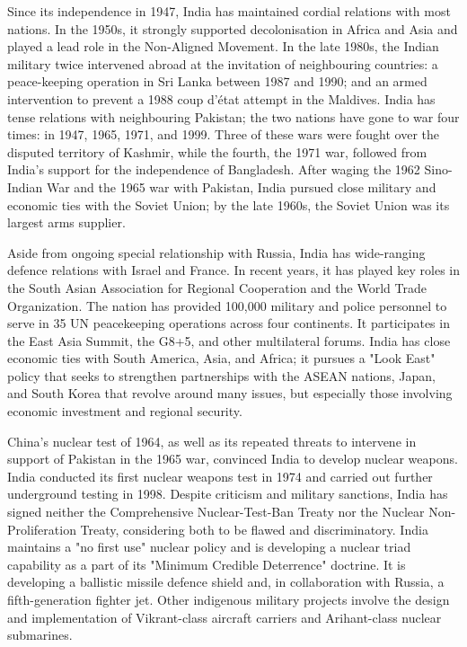 Since its independence in 1947, India has maintained cordial relations
with most nations. In the 1950s, it strongly supported decolonisation in
Africa and Asia and played a lead role in the Non-Aligned Movement. In
the late 1980s, the Indian military twice intervened abroad at the
invitation of neighbouring countries: a peace-keeping operation in Sri
Lanka between 1987 and 1990; and an armed intervention to prevent a 1988
coup d'état attempt in the Maldives. India has tense relations with
neighbouring Pakistan; the two nations have gone to war four times: in
1947, 1965, 1971, and 1999. Three of these wars were fought over the
disputed territory of Kashmir, while the fourth, the 1971 war, followed
from India's support for the independence of Bangladesh. After waging
the 1962 Sino-Indian War and the 1965 war with Pakistan, India pursued
close military and economic ties with the Soviet Union; by the late
1960s, the Soviet Union was its largest arms supplier.

Aside from ongoing special relationship with Russia, India has
wide-ranging defence relations with Israel and France. In recent years,
it has played key roles in the South Asian Association for Regional
Cooperation and the World Trade Organization. The nation has provided
100,000 military and police personnel to serve in 35 UN peacekeeping
operations across four continents. It participates in the East Asia
Summit, the G8+5, and other multilateral forums. India has close
economic ties with South America, Asia, and Africa; it pursues a "Look
East" policy that seeks to strengthen partnerships with the ASEAN
nations, Japan, and South Korea that revolve around many issues, but
especially those involving economic investment and regional security.

China's nuclear test of 1964, as well as its repeated threats to
intervene in support of Pakistan in the 1965 war, convinced India to
develop nuclear weapons. India conducted its first nuclear weapons test
in 1974 and carried out further underground testing in 1998. Despite
criticism and military sanctions, India has signed neither the
Comprehensive Nuclear-Test-Ban Treaty nor the Nuclear Non-Proliferation
Treaty, considering both to be flawed and discriminatory. India
maintains a "no first use" nuclear policy and is developing a nuclear
triad capability as a part of its "Minimum Credible Deterrence"
doctrine. It is developing a ballistic missile defence shield and, in
collaboration with Russia, a fifth-generation fighter jet. Other
indigenous military projects involve the design and implementation of
Vikrant-class aircraft carriers and Arihant-class nuclear submarines.


